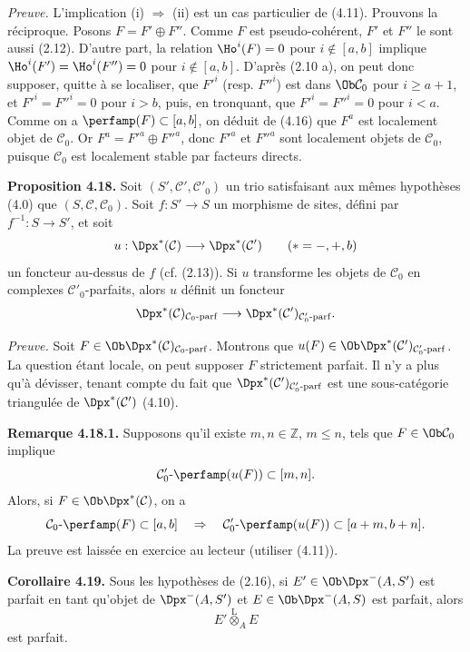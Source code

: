 \documentclass[11pt]{article}
\begin{document}
\emph{Preuve.} L'implication (i) \(\Rightarrow\) (ii) est un cas particulier de (4.11). Prouvons la réciproque. Posons \(F=F'\oplus F''\). Comme \(F\) est pseudo-cohérent, \(F'\) et \(F''\) le sont aussi (2.12). D'autre part, la relation \(\Ho^i(F)=0\) pour \(i\notin[a,b]\) implique \(\Ho^i(F')=\Ho^i(F'')=0\) pour \(i\notin[a,b]\). D'après (2.10 a), on peut donc supposer, quitte à se localiser, que \(F'^i\) (resp. \(F''^i\)) est dans \(\Ob\mathcal C_0\) pour \(i\geq a+1\), et \(F'^i=F''^i=0\) pour \(i>b\), puis, en tronquant, que \(F'^i=F''^i=0\) pour \(i<a\). Comme on a \(\perfamp(F)\subset[a,b]\), on déduit de (4.16) que \(F^a\) est localement objet de \(\mathcal C_0\). Or \(F^a=F'^a\oplus F''^a\), donc \(F'^a\) et \(F''^a\) sont localement objets de \(\mathcal C_0\), puisque \(\mathcal C_0\) est localement stable par facteurs directs.

\textbf{Proposition 4.18.} Soit \((S',\mathcal C',\mathcal C'_0)\) un trio satisfaisant aux mêmes hypothèses (4.0) que \((S,\mathcal C,\mathcal C_0)\). Soit \(f:S'\to S\) un morphisme de sites, défini par \(f^{-1}:S\to S'\), et soit
\[
  u:\Dpx^*(\mathcal C)\longrightarrow \Dpx^*(\mathcal C')\qquad (*=-,+,b)
\]
un foncteur au-dessus de \(f\) (cf. (2.13)). Si \(u\) transforme les objets de \(\mathcal C_0\) en complexes \(\mathcal C'_0\)-parfaits, alors \(u\) définit un foncteur
\[
  \Dpx^*(\mathcal C)_{\mathcal C_0\text{-}\mathrm{parf}}
  \longrightarrow
  \Dpx^*(\mathcal C')_{\mathcal C'_0\text{-}\mathrm{parf}}.
\]

\emph{Preuve.} Soit \(F\in\Ob\Dpx^*(\mathcal C)_{\mathcal C_0\text{-}\mathrm{parf}}\). Montrons que \(u(F)\in\Ob\Dpx^*(\mathcal C')_{\mathcal C'_0\text{-}\mathrm{parf}}\). La question étant locale, on peut supposer \(F\) strictement parfait. Il n'y a plus qu'à dévisser, tenant compte du fait que \(\Dpx^*(\mathcal C')_{\mathcal C'_0\text{-}\mathrm{parf}}\) est une sous-catégorie triangulée de \(\Dpx^*(\mathcal C')\) (4.10).

\textbf{Remarque 4.18.1.} Supposons qu'il existe \(m,n\in\mathbb Z\), \(m\leq n\), tels que \(F\in\Ob\mathcal C_0\) implique
\[
  \mathcal C'_0\text{-}\perfamp(u(F))\subset[m,n].
\]
Alors, si \(F\in\Ob\Dpx^*(\mathcal C)\), on a
\[
  \mathcal C_0\text{-}\perfamp(F)
  \subset[a,b]
  \quad\Rightarrow\quad
  \mathcal C'_0\text{-}\perfamp(u(F))
  \subset[a+m,b+n].
\]
La preuve est laissée en exercice au lecteur (utiliser (4.11)).

\textbf{Corollaire 4.19.} Sous les hypothèses de (2.16), si \(E'\in\Ob\Dpx^-(A,S')\) est parfait en tant qu'objet de \(\Dpx^-(A,S')\) et \(E\in\Ob\Dpx^-(A,S)\) est parfait, alors
\[
  E'\overset{\mathrm L}{\otimes}_A E
\]
est parfait.
\end{document}
